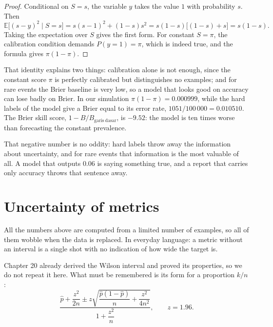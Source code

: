 \begin{proof}[Proof]
Conditional on $S=s$, the variable $y$ takes the value $1$ with probability $s$. Then
\[
\mathbb{E}\bigl[(s-y)^2\mid S=s\bigr]
=s(s-1)^2+(1-s)s^2=s(1-s)\bigl[(1-s)+s\bigr]=s(1-s).
\]
Taking the expectation over $S$ gives the first form. For constant $S=\pi$, the calibration
condition demands $P(y=1)=\pi$, which is indeed true, and the formula gives $\pi(1-\pi)$.
\end{proof}

That identity explains two things: calibration alone is not enough, since the constant score $\pi$
is perfectly calibrated but distinguishes no examples; and for rare events the Brier baseline is
very low, so a model that looks good on accuracy can lose badly on Brier. In our simulation
$\pi(1-\pi)=0.000999$, while the hard labels of the model give a Brier equal to its error rate,
$1051/100\,000=0.010510$. The Brier skill score, $1-B/B_{\mathrm{garis\ dasar}}$, is $-9.52$: the
model is ten times worse than forecasting the constant prevalence.

That negative number is no oddity: hard labels throw away the information about uncertainty, and
for rare events that information is the most valuable of all. A model that outputs $0.06$ is saying
something true, and a report that carries only accuracy throws that sentence away.

\section{Uncertainty of metrics}

All the numbers above are computed from a limited number of examples, so all of them wobble when
the data is replaced. In everyday language: a metric without an interval is a single shot with no
indication of how wide the target is.

Chapter 20 already derived the Wilson interval and proved its properties, so we do not repeat it
here. What must be remembered is its form for a proportion $k/n$:
\[
\frac{\hat p+\dfrac{z^2}{2n}\pm
z\sqrt{\dfrac{\hat p(1-\hat p)}{n}+\dfrac{z^2}{4n^2}}}{1+\dfrac{z^2}{n}},
\qquad z=1.96 .
\]

